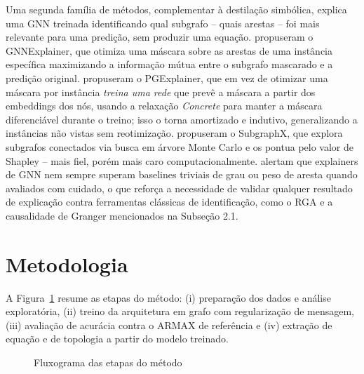 \documentclass[
	article,		%
	12pt,			%
	oneside,
	a4paper,
	brazil
]{abntex2}
\begin{document}
Uma segunda família de métodos, complementar à destilação simbólica,
explica uma GNN treinada identificando qual subgrafo -- quais arestas --
foi mais relevante para uma predição, sem produzir uma equação.
 propuseram o GNNExplainer, que otimiza uma máscara
sobre as arestas de uma instância específica maximizando a informação
mútua entre o subgrafo mascarado e a predição original.
 propuseram o PGExplainer, que em vez de otimizar uma
máscara por instância \emph{treina uma rede} que prevê a máscara a partir
dos embeddings dos nós, usando a relaxação \textit{Concrete}
\cite{maddison2017} para manter a máscara diferenciável durante o treino;
isso o torna amortizado e indutivo, generalizando a instâncias não vistas
sem reotimização.  propuseram o SubgraphX, que explora
subgrafos conectados via busca em árvore Monte Carlo e os pontua pelo valor
de Shapley \cite{shapley1953} -- mais fiel, porém mais caro
computacionalmente.  alertam que explainers de GNN
nem sempre superam baselines triviais de grau ou peso de aresta quando
avaliados com cuidado, o que reforça a necessidade de validar qualquer
resultado de explicação contra ferramentas clássicas de identificação,
como o RGA e a causalidade de Granger mencionados na Subseção 2.1.

\section{Metodologia}

A Figura~\ref{fig:fluxograma} resume as etapas do método: (i) preparação
dos dados e análise exploratória, (ii) treino da arquitetura em grafo com
regularização de mensagem, (iii) avaliação de acurácia contra o ARMAX de
referência e (iv) extração de equação e de topologia a partir do modelo
treinado.

\begin{figure}[htb]
	\centering
	\caption{Fluxograma das etapas do método}
	\label{fig:fluxograma}
\end{figure}
\end{document}
